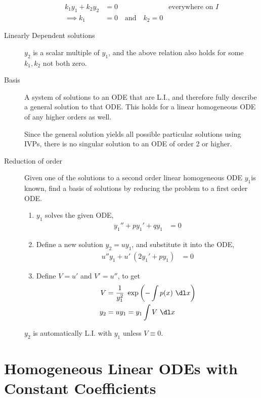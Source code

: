 \begin{description}
\begin{align}
            k_{1}y_{1} + k_{2}y_{2} & = 0                                  & \text{everywhere on }I \\
            \implies k_{1}          & = 0 \quad \text{and} \quad k_{2} = 0
        \end{align}
    \item[Linearly Dependent solutions] $ y_{2} $ is a scalar multiple of $ y_{1} $, and the
        above relation also holds for some $ k_{1}, k_{2} $ not both zero.
    \item[Basis] A system of solutions to an ODE that are L.I., and therefore fully describe
        a general solution to that ODE. This holds for a linear homogeneous ODE of any higher
        orders as well.

        Since the general solution yields all possible particular solutions using IVPs, there is
        no singular solution to an ODE of order 2 or higher.
    \item[Reduction of order] Given one of the solutions to a second order linear homogeneous ODE
        $ y_{1} $is known, find a basis of solutions by reducing the problem to a first order
        ODE.
        \begin{enumerate}
            \item $ y_{1} $ solves the given ODE,
                  \begin{align}
                      y_{1}'' + py_{1}' + qy_{1} & = 0
                  \end{align}
            \item Define a new solution $ y_{2} = uy_{1} $, and substitute it into the ODE,
                  \begin{align}
                      u'' y_{1} + u'\ (2y_{1}' + py_{1}) & = 0
                  \end{align}
            \item Define $ V = u' $ and $ V' = u'' $, to get
                  \begin{align}
                      V     & = \frac{1}{y_{1}^{2}}\ \exp \left( -\int p(x)\ \dl x \right) \\
                      y_{2} & = uy_{1} = y_{1}\int V\ \dl x
                  \end{align}
        \end{enumerate}
        $ y_{2} $ is automatically L.I. with $ y_{1} $ unless $ V \equiv 0 $.
\end{description}

\section{Homogeneous Linear ODEs with Constant Coefficients}

